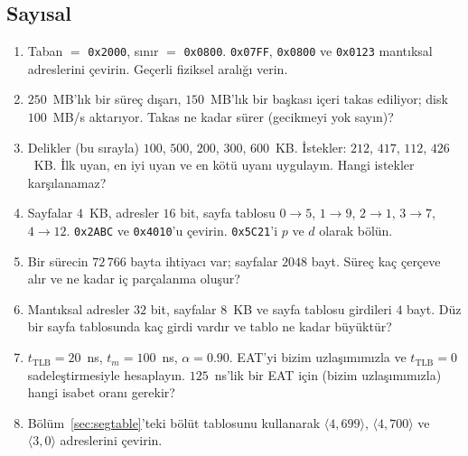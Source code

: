 \documentclass[11pt,a4paper]{article}
\begin{document}
\subsection*{Sayısal}
\begin{enumerate}[leftmargin=1.6em,resume]
  \item Taban $=$ \texttt{0x2000}, sınır $=$ \texttt{0x0800}. \texttt{0x07FF}, \texttt{0x0800} ve \texttt{0x0123} mantıksal adreslerini çevirin. Geçerli fiziksel aralığı verin.
  \item $250$~MB'lık bir süreç dışarı, $150$~MB'lık bir başkası içeri takas ediliyor; disk $100$~MB/s aktarıyor. Takas ne kadar sürer (gecikmeyi yok sayın)?
  \item Delikler (bu sırayla) $100$, $500$, $200$, $300$, $600$~KB. İstekler: $212$, $417$, $112$, $426$~KB. İlk uyan, en iyi uyan ve en kötü uyanı uygulayın. Hangi istekler karşılanamaz?
  \item Sayfalar $4$~KB, adresler $16$ bit, sayfa tablosu $0\to5$, $1\to9$, $2\to1$, $3\to7$, $4\to12$. \texttt{0x2ABC} ve \texttt{0x4010}'u çevirin. \texttt{0x5C21}'i $p$ ve $d$ olarak bölün.
  \item Bir sürecin $72\,766$ bayta ihtiyacı var; sayfalar $2048$ bayt. Süreç kaç çerçeve alır ve ne kadar iç parçalanma oluşur?
  \item Mantıksal adresler $32$ bit, sayfalar $8$~KB ve sayfa tablosu girdileri $4$ bayt. Düz bir sayfa tablosunda kaç girdi vardır ve tablo ne kadar büyüktür?
  \item $t_{\text{TLB}} = 20$~ns, $t_{m} = 100$~ns, $\alpha = 0.90$. EAT'yi bizim uzlaşımımızla ve $t_{\text{TLB}} = 0$ sadeleştirmesiyle hesaplayın. $125$~ns'lik bir EAT için (bizim uzlaşımımızla) hangi isabet oranı gerekir?
  \item Bölüm~\ref{sec:segtable}'teki bölüt tablosunu kullanarak $\langle 4, 699\rangle$, $\langle 4, 700\rangle$ ve $\langle 3, 0\rangle$ adreslerini çevirin.
\end{enumerate}
\end{document}

